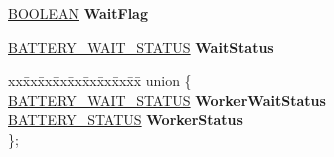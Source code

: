 \begin{DoxyCompactItemize}
\hyperlink{_processor_bind_8h_a112e3146cb38b6ee95e64d85842e380a}{B\+O\+O\+L\+E\+AN} {\bfseries Wait\+Flag}
\item 
\mbox{\label{struct___c_o_m_p_b_a_t_t___b_a_t_t_e_r_y___d_a_t_a_a52668176c5553b32f956ab5a68e4529e}} 
\hyperlink{struct___b_a_t_t_e_r_y___w_a_i_t___s_t_a_t_u_s}{B\+A\+T\+T\+E\+R\+Y\+\_\+\+W\+A\+I\+T\+\_\+\+S\+T\+A\+T\+US} {\bfseries Wait\+Status}
\item 
\mbox{\label{struct___c_o_m_p_b_a_t_t___b_a_t_t_e_r_y___d_a_t_a_a924f5009fb53a8d85d1b7146a12beb26}} 
\begin{tabbing}
xx\=xx\=xx\=xx\=xx\=xx\=xx\=xx\=xx\=\kill
union \{\\
\>\hyperlink{struct___b_a_t_t_e_r_y___w_a_i_t___s_t_a_t_u_s}{BATTERY\_WAIT\_STATUS} {\bfseries WorkerWaitStatus}\\
\>\hyperlink{struct___b_a_t_t_e_r_y___s_t_a_t_u_s}{BATTERY\_STATUS} {\bfseries WorkerStatus}\\
\}; \\


\end{tabbing}
\end{DoxyCompactItemize}

